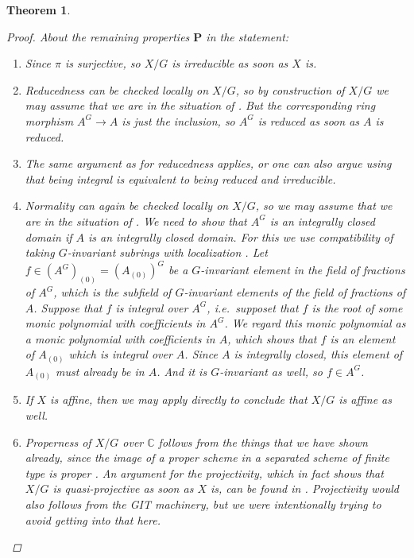 \documentclass[12pt,a4paper]{amsart}
\theoremstyle{plain}
\newtheorem{thm}{Theorem}[section]
\theoremstyle{definition}
\theoremstyle{remark}
\begin{document}
\begin{thm}
\begin{proof}
    About the remaining properties $\mathbf{P}$ in the statement:
    \begin{enumerate}[label=(\alph*)]
      \item Since $\pi$ is surjective, so $X/G$ is irreducible as soon as $X$ is.
      \item Reducedness can be checked locally on $X/G$, so by construction of $X/G$ we may assume that we are in the situation of .
        But the corresponding ring morphism $A^{G} \to A$ is just the inclusion, so $A^{G}$ is reduced as soon as $A$ is reduced.
      \item The same argument as for reducedness applies, or one can also argue using that being integral is equivalent to being reduced and irreducible.
      \item Normality can again be checked locally on $X/G$, so we may assume that we are in the situation of .
        We need to show that $A^{G}$ is an integrally closed domain if $A$ is an integrally closed domain.
        For this we use compatibility of taking $G$-invariant subrings with localization \cite[Exercise 5.12]{am69}.
        Let $f \in (A^{G})_{(0)} = (A_{(0)})^{G}$ be a $G$-invariant element in the field of fractions of $A^{G}$, which is the subfield of $G$-invariant elements of the field of fractions of $A$.
        Suppose that $f$ is integral over $A^{G}$, i.e.~supposet that $f$ is the root of some monic polynomial with coefficients in $A^{G}$.
        We regard this monic polynomial as a monic polynomial with coefficients in $A$, which shows that $f$ is an element of $A_{(0)}$ which is integral over $A$.
        Since $A$ is integrally closed, this element of $A_{(0)}$ must already be in $A$.
        And it is $G$-invariant as well, so $f \in A^{G}$.
      \item If $X$ is affine, then we may apply  directly to conclude that $X/G$ is affine as well.
      \item Properness of $X/G$ over $\mathbb{C}$ follows from the things that we have shown already, since the image of a proper scheme in a separated scheme of finite type is proper \cite[\href{https://stacks.math.columbia.edu/tag/03GN}{Tag 03GN}]{stacks-project}.
        An argument for the projectivity, which in fact shows that $X/G$ is quasi-projective as soon as $X$ is, can be found in \cite[Proposition IV.1.5]{knu71}.
        Projectivity would also follows from the GIT machinery, but we were intentionally trying to avoid getting into that here.
    \end{enumerate}
  \end{proof}
\end{thm}



\vfill
\end{document}

